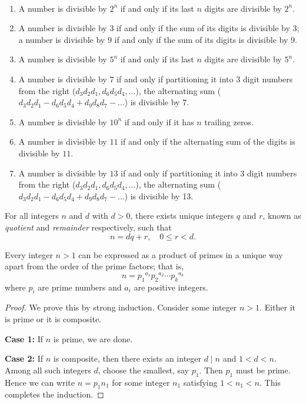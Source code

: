 \begin{lemma} \ 
\begin{enumerate}[label=(\roman*)]
\item A number is divisible by $2^n$ if and only if its last $n$ digits are divisible by $2^n$.
\item A number is divisible by $3$ if and only if the sum of its digits is divisible by $3$; a number is divisible by $9$ if and only if the sum of its digits is divisible by $9$.
\item A number is divisible by $5^n$ if and only if its last $n$ digits are divisible by $5^n$.
\item A number is divisible by $7$ if and only if partitioning it into 3 digit numbers from the right ($d_3d_2d_1,d_6d_5d_4,\dots$), the alternating sum ($d_3d_2d_1 - d_6d_5d_4 + d_9d_8d_7 - \dots$) is divisible by $7$.
\item A number is divisible by $10^n$ if and only if it has $n$ trailing zeros.
\item A number is divisible by $11$ if and only if the alternating sum of the digits is divisible by $11$.
\item A number is divisible by $13$ if and only if partitioning it into 3 digit numbers from the right ($d_3d_2d_1,d_6d_5d_4,\dots$), the alternating sum ($d_3d_2d_1 - d_6d_5d_4 + d_9d_8d_7 - \dots$) is divisible by 13.
\end{enumerate}
\end{lemma}

\begin{theorem}
For all integers $n$ and $d$ with $d>0$, there exists unique integers $q$ and $r$, known as \emph{quotient} and \emph{remainder} respectively, such that
\[n=dq+r, \quad 0\le r<d.\]
\end{theorem}

\begin{theorem}
Every integer $n>1$ can be expressed as a product of primes in a unique way apart from the order of the prime factors; that is,
\[n={p_1}^{a_1}{p_2}^{a_2}\cdots{p_k}^{a_k}\]
where $p_i$ are prime numbers and $a_i$ are positive integers. 
\end{theorem}

\begin{proof}
We prove this by strong induction. Consider some integer $n > 1$. Either it is prime or it is composite. 

\textbf{Case 1:} If $n$ is prime, we are done. 

\textbf{Case 2:} If $n$ is composite, then there exists an integer $d \mid n$ and $1 < d < n$. Among all such integers $d$, choose the smallest, say $p_1$. Then $p_1$ must be prime. Hence we can write $n = p_1 n_1$ for some integer $n_1$ satisfying $1 < n_1 < n$. This completes the induction.
\end{proof}


